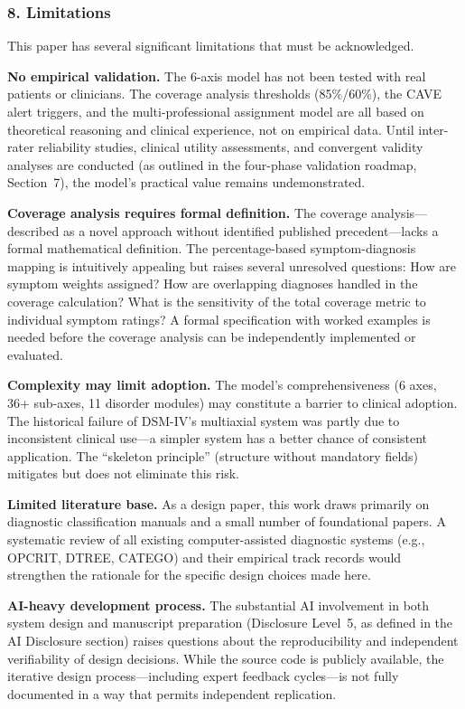 \documentclass[11pt,a4paper]{article}
\begin{document}
\subsubsection*{8. Limitations}

This paper has several significant limitations that must be acknowledged.

\textbf{No empirical validation.} The 6-axis model has not been tested with real patients or clinicians. The coverage analysis thresholds (85\%/60\%), the CAVE alert triggers, and the multi-professional assignment model are all based on theoretical reasoning and clinical experience, not on empirical data. Until inter-rater reliability studies, clinical utility assessments, and convergent validity analyses are conducted (as outlined in the four-phase validation roadmap, Section~7), the model's practical value remains undemonstrated.

\textbf{Coverage analysis requires formal definition.} The coverage analysis---described as a novel approach without identified published precedent---lacks a formal mathematical definition. The percentage-based symptom-diagnosis mapping is intuitively appealing but raises several unresolved questions: How are symptom weights assigned? How are overlapping diagnoses handled in the coverage calculation? What is the sensitivity of the total coverage metric to individual symptom ratings? A formal specification with worked examples is needed before the coverage analysis can be independently implemented or evaluated.

\textbf{Complexity may limit adoption.} The model's comprehensiveness (6 axes, 36+ sub-axes, 11 disorder modules) may constitute a barrier to clinical adoption. The historical failure of DSM-IV's multiaxial system was partly due to inconsistent clinical use---a simpler system has a better chance of consistent application. The ``skeleton principle'' (structure without mandatory fields) mitigates but does not eliminate this risk.

\textbf{Limited literature base.} As a design paper, this work draws primarily on diagnostic classification manuals and a small number of foundational papers. A systematic review of all existing computer-assisted diagnostic systems (e.g., OPCRIT, DTREE, CATEGO) and their empirical track records would strengthen the rationale for the specific design choices made here.

\textbf{AI-heavy development process.} The substantial AI involvement in both system design and manuscript preparation (Disclosure Level~5, as defined in the AI Disclosure section) raises questions about the reproducibility and independent verifiability of design decisions. While the source code is publicly available, the iterative design process---including expert feedback cycles---is not fully documented in a way that permits independent replication.
\end{document}
